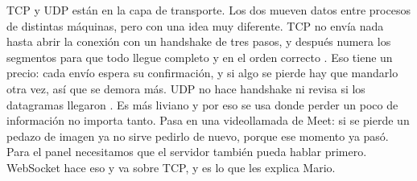 TCP y UDP están en la capa de transporte. Los dos mueven datos entre procesos de distintas máquinas, pero con una idea muy diferente.
TCP no envía nada hasta abrir la conexión con un handshake de tres pasos, y después numera los segmentos para que todo llegue completo y en el orden correcto \cite[p.~7]{barghash2022}.
Eso tiene un precio: cada envío espera su confirmación, y si algo se pierde hay que mandarlo otra vez, así que se demora más.
UDP no hace handshake ni revisa si los datagramas llegaron \cite[pp.~7--8]{barghash2022}. Es más liviano y por eso se usa donde perder un poco de información no importa tanto.
Pasa en una videollamada de Meet: si se pierde un pedazo de imagen ya no sirve pedirlo de nuevo, porque ese momento ya pasó.
Para el panel necesitamos que el servidor también pueda hablar primero. WebSocket hace eso y va sobre TCP, y es lo que les explica Mario.
